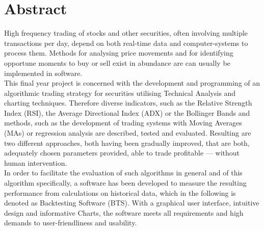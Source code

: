 \chapter*{Abstract}

High frequency trading of stocks and other securities, often involving multiple transactions per day, depend on both real-time data
and computer-systems to process them.
Methods for analysing price movements and for identifying opportune moments to buy or sell exist in abundance are can usually be
implemented in software.\\

This final year project is concerned with the development and programming of an algorithmic trading strategy for securities
utilising Technical Analysis and charting techniques. 
Therefore diverse indicators, such as the Relative Strength Index (RSI), the Average Directional Index (ADX) or the Bollinger Bands and methods, such as the development of trading systems
with Moving Averages (MAs) or regression analysis are described, tested and evaluated. Resulting are two dif\-ferent approaches, both having been
gradually improved, that are both, adequately chosen parameters provided, able to trade profitable --- without human intervention.\\

In order to facilitate the evaluation of such algorithms in general and of this algorithm specifically, a software has been developed to
measure the resulting performance from calculations on historical data, which in the following is denoted as Backtesting Software (BTS).
With a graphical user interface, intuitive design and informative Charts, the software meets all requirements and high demands to user-friendliness and usability.